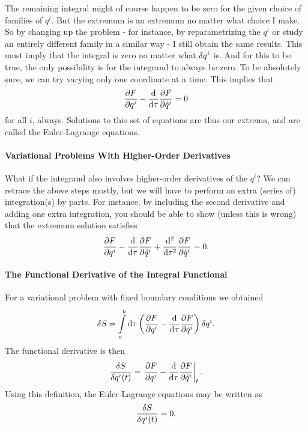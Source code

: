 The remaining integral might of course happen to be zero for the given choice of families of $q^{i}$. But the extremum is an extremum no matter what choice I make. So by changing up the problem - for instance, by reparametrizing the $q^{i}$ or study an entirely different family in a similar way - I still obtain the same results. This must imply that the integral is zero no matter what $\var{q^{i}}$ is. And for this to be true, the only possibility is for the integrand to always be zero. To be absolutely sure, we can try varying only one coordinate at a time. This implies that
\begin{align*}
	\pdv{F}{q^{i}} - \dv{\tau}\pdv{F}{\dot{q}^{i}} = 0
\end{align*}
for all $i$, always. Solutions to this set of equations are thus our extrema, and are called the Euler-Lagrange equations.

\paragraph{Variational Problems With Higher-Order Derivatives}
What if the integrand also involves higher-order derivatives of the $q^{i}$? We can retrace the above steps mostly, but we will have to perform an extra (series of) integration(s) by parts. For instance, by including the second derivative and adding one extra integration, you should be able to show (unless this is wrong) that the extremum solution satisfies
\begin{align*}
	\pdv{F}{q^{i}} - \dv{\tau}\pdv{F}{\dot{q}^{i}} + \dv[2]{\tau}\pdv{F}{\ddot{q}^{i}} = 0.
\end{align*}

\paragraph{The Functional Derivative of the Integral Functional}
For a variational problem with fixed boundary conditions we obtained
\begin{align*}
	\var{S} = \int\limits_{a}^{b}\dd{\tau}{\left(\pdv{F}{q^{i}} - \dv{\tau}\pdv{F}{\dot{q}^{i}}\right)\var{q^{i}}}.
\end{align*}
The functional derivative is then
\begin{align*}
	\fdv{S}{q^{i}(t)} = \eval{\pdv{F}{q^{i}} - \dv{\tau}\pdv{F}{\dot{q}^{i}}}_{t}.
\end{align*}
Using this definition, the Euler-Lagrange equations may be written as
\begin{align*}
	\fdv{S}{q^{i}(t)} = 0.
\end{align*}
